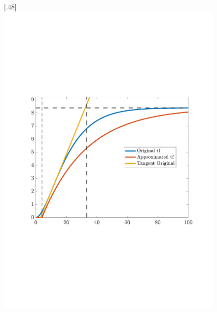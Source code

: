 \begin{figure}[H]
    \centering

    [.48\textwidth]{\includegraphics[width=1\linewidth, scale=1, trim=75 230 55 120,clip]{fig/G_11_max_slope_8ms.pdf}}
%

\end{figure}
